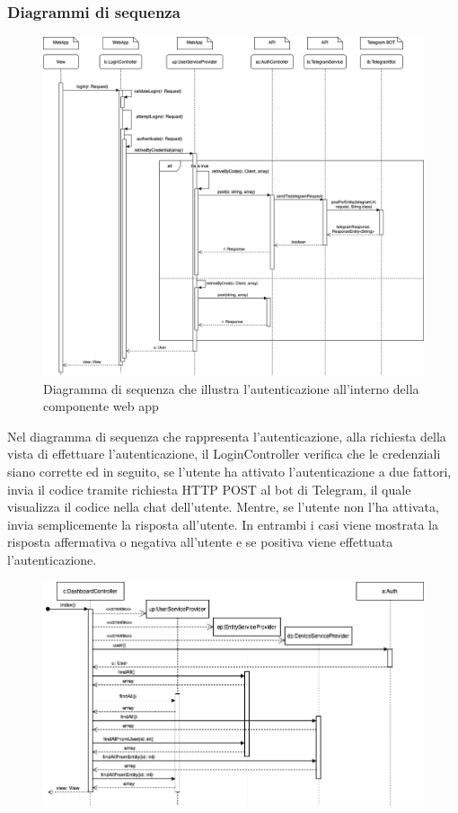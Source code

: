 	\begin{landscape}
	\subsubsection{Diagrammi di sequenza}%
		\begin{figure}[H]
			\centering
			\includegraphics[scale=0.400]{res/images/WEBAPP/AutenticazioneTfa.png}
			\caption{Diagramma di sequenza che illustra l'autenticazione all'interno della componente web app}
			\label{Diagramma 23}
		\end{figure}
		Nel diagramma di sequenza che rappresenta l'autenticazione, alla richiesta della vista di effettuare l'autenticazione, il LoginController verifica che le credenziali siano corrette ed in seguito, se l'utente ha attivato l'autenticazione a due fattori, invia il codice tramite richiesta HTTP POST al bot di Telegram, il quale visualizza il codice nella chat dell'utente.
		\newline
		Mentre, se l'utente non l'ha attivata, invia semplicemente la risposta all'utente. In entrambi i casi viene mostrata la risposta affermativa o negativa all'utente e se positiva viene effettuata l'autenticazione.
		\begin{figure}[H]
			\centering
			\includegraphics[scale=0.600]{res/images/WEBAPP/Dashboard.index.png}

\end{figure}
\end{landscape}
